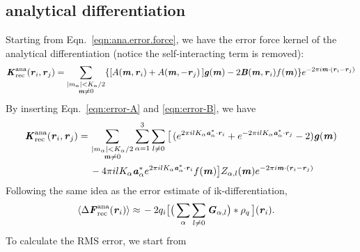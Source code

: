 \documentclass[aps,pre,preprint]{revtex4}
\renewcommand{\v}[1]{\textbf{\textit{#1}}}
\begin{document}
\subsection{analytical differentiation}
Starting from Eqn.~\eqref{eqn:ana.error.force}, we have the error force kernel
of the analytical differentiation (notice the self-interacting term is removed):
\begin{align}
  \v K^{\textrm{ana}}_{\textrm{rec}}(\v r_i, \v r_j)
  =
  \sum_{
    \begin{subarray}{c}
      \vert m_{\alpha}\vert < K_\alpha/2\\
      \v m\neq 0
    \end{subarray}}
  \{
  [A(\v m, \v r_i) + A(\v m,-\v r_j)\,]
  \v g(\v m) -
  2\v B(\v m,\v r_i) f(\v m)
  \}
  e^{-2\pi i\v m\cdot(\v r_i-\v r_j)}
\end{align}
By inserting Eqn.~\eqref{eqn:error-A} and \eqref{eqn:error-B}, we have
\begin{align}\nonumber
  \v K^{\textrm{ana}}_{\textrm{rec}}(\v r_i, \v r_j)
  =\,&
  \sum_{
    \begin{subarray}{c}
      \vert m_{\alpha}\vert < K_\alpha/2\\
      \v m\neq 0
    \end{subarray}}
  \sum_{\alpha=1}^3\sum_{l\neq 0}
  \big[
  \,(
  e^{2\pi i l K_\alpha\v a^\ast_\alpha\cdot \v r_i} +
  e^{-2\pi i l K_\alpha\v a^\ast_\alpha\cdot \v r_j}
  - 2
  )
  \v g(\v m)
  \\  \label{eqn:ik.kernel.2}
  \,&
  - 4\pi i l K_\alpha\v a_\alpha^\ast e^{2\pi i l K_\alpha\v a^\ast_\alpha\cdot \v r_i}
  f(\v m)
  \big]
  Z_{\alpha,l}(\v m)
  e^{-2\pi i\v m\cdot(\v r_i-\v r_j)}  
\end{align}
Following  the same idea as the error estimate of  ik-differentiation,
\begin{align}
  \langle\Delta\v F^{\textrm{ana}}_{\textrm{rec}}(\v r_i)\rangle
  \approx\,&
  -2q_i
  \big[
  \big(
  \sum_{\alpha}\sum_{l\neq 0}\v G_{\alpha,l}
  \big)
  \ast\rho_q\,
  \big] (\v r_i).
\end{align}
To calculate the RMS error, we start from
\end{document}
